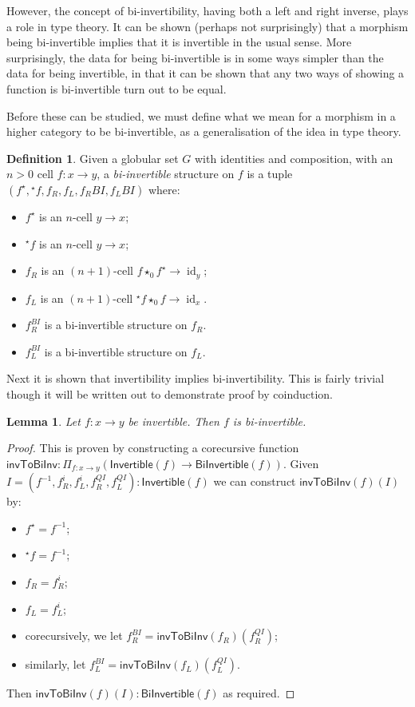 \documentclass[draft]{article}
\newtheorem{lemma}[theorem]{Lemma} \theoremstyle{definition}
\newtheorem{definition}[theorem]{Definition} \theoremstyle{remark}
\DeclareMathOperator{\id}{id}
\newcommand{\linv}[1]{{}^\star\!#1} \newcommand{\rinv}[1]{#1^\star}
\newcommand{\inv}[1]{#1^{-1}} \newcommand{\comp}{\star}
\begin{document}
However, the concept of bi-invertibility, having both a left and right
inverse, plays a role in type theory. It can be shown (perhaps not
surprisingly) that a morphism being bi-invertible implies that it is
invertible in the usual sense. More surprisingly, the data for being
bi-invertible is in some ways simpler than the data for being
invertible, in that it can be shown that any two ways of showing a
function is bi-invertible turn out to be equal.

Before these can be studied, we must define what we mean for a
morphism in a higher category to be bi-invertible, as a generalisation
of the idea in type theory.

\begin{definition}
  Given a globular set \(G\) with identities and composition, with an
  \(n > 0\) cell \(f : x \to y\), a \emph{bi-invertible} structure on
  \(f\) is a tuple \((\rinv f, \linv f, f_R, f_L, f_R{}BI, f_L{}BI)\)
  where:
  \begin{itemize}
  \item \(\rinv f\) is an \(n\)-cell \(y \to x\);
  \item \(\linv f\) is an \(n\)-cell \(y \to x\);
  \item \(f_R\) is an \((n+1)\)-cell \(f \comp_0 \rinv f \to \id_y\);
  \item \(f_L\) is an \((n+1)\)-cell \(\linv f \comp_0 f \to \id_x\).
  \item \(f_R^{BI}\) is a bi-invertible structure on \(f_R\).
  \item \(f_L^{BI}\) is a bi-invertible structure on \(f_L\).
  \end{itemize}
\end{definition}

Next it is shown that invertibility implies bi-invertibility. This is
fairly trivial though it will be written out to demonstrate proof by
coinduction.

\begin{lemma}\label{inv-to-bi-inv}
  Let \(f : x \to y\) be invertible. Then \(f\) is bi-invertible.
\end{lemma}

\begin{proof}
  This is proven by constructing a corecursive function
  \(\mathsf{invToBiInv} : \Pi_{f : x \to y} (\mathsf{Invertible}(f)
  \to \mathsf{BiInvertible}(f))\). Given \(I = (\inv
  f,f_R^i,f_L^i,f_R^{QI}, f_L^{QI}) : \mathsf{Invertible}(f)\) we can
  construct \(\mathsf{invToBiInv}(f)(I)\) by:
  \begin{itemize}
  \item \(\rinv f = \inv f\);
  \item \(\linv f = \inv f\);
  \item \(f_R = f_R^i\);
  \item \(f_L = f_L^i\);
  \item corecursively, we let \(f_R^{BI} =
    \mathsf{invToBiInv}(f_R)(f_R^{QI})\);
  \item similarly, let \(f_L^{BI} =
    \mathsf{invToBiInv}(f_L)(f_L^{QI})\).
  \end{itemize}
  Then \(\mathsf{invToBiInv}(f)(I) : \mathsf{BiInvertible}(f)\) as
  required.
\end{proof}
\end{document}

